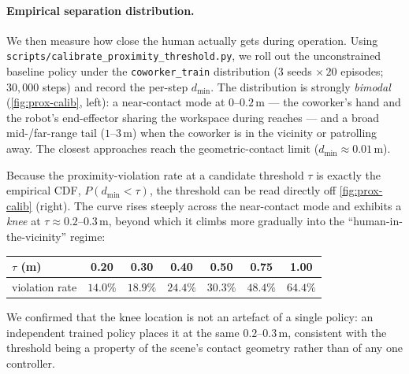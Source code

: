 \paragraph{Empirical separation distribution.}
We then measure how close the human actually gets during operation. Using
\texttt{scripts/calibrate\_proximity\_threshold.py}, we roll out the unconstrained baseline
policy under the \texttt{coworker\_train} distribution ($3$ seeds $\times\,20$ episodes;
$30{,}000$ steps) and record the per-step $d_{\min}$. The distribution is strongly
\emph{bimodal} (\cref{fig:prox-calib}, left): a near-contact mode at $0$--$0.2$\,m --- the
coworker's hand and the robot's end-effector sharing the workspace during reaches --- and a
broad mid-/far-range tail ($1$--$3$\,m) when the coworker is in the vicinity or patrolling
away. The closest approaches reach the geometric-contact limit ($d_{\min}\!\approx\!0.01$\,m).

Because the proximity-violation rate at a candidate threshold $\tau$ is exactly the
empirical CDF, $P(d_{\min}<\tau)$, the threshold can be read directly off
\cref{fig:prox-calib} (right). The curve rises steeply across the near-contact mode and
exhibits a \emph{knee} at $\tau\approx0.2$--$0.3$\,m, beyond which it climbs more gradually
into the ``human-in-the-vicinity'' regime:

\begin{center}
\begin{tabular}{lcccccc}
\toprule
$\tau$ (m) & 0.20 & 0.30 & 0.40 & 0.50 & 0.75 & 1.00 \\
\midrule
violation rate & $14.0\%$ & $\mathbf{18.9\%}$ & $24.4\%$ & $30.3\%$ & $48.4\%$ & $64.4\%$ \\
\bottomrule
\end{tabular}
\end{center}

We confirmed that the knee location is not an artefact of a single policy: an independent
trained policy places it at the same $0.2$--$0.3$\,m, consistent with the threshold being a
property of the scene's contact geometry rather than of any one controller.

